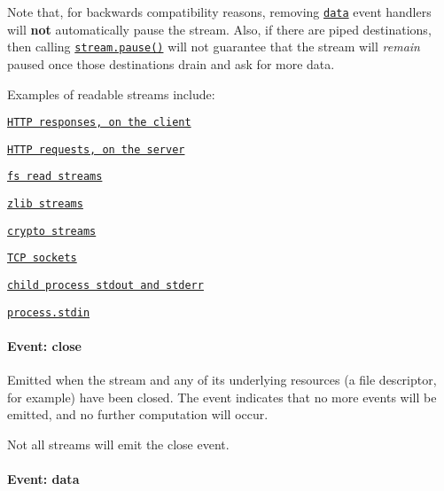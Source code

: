 Note that, for backwards compatibility reasons, removing \href{#stream_event_data}{\tt {\ttfamily \textquotesingle{}data\textquotesingle{}}} event handlers will {\bfseries not} automatically pause the stream. Also, if there are piped destinations, then calling \href{#stream_readable_pause}{\tt {\ttfamily stream.\+pause()}} will not guarantee that the stream will {\itshape remain} paused once those destinations drain and ask for more data.

Examples of readable streams include\+:


\begin{DoxyItemize}
\item \href{https://nodejs.org/docs/v5.8.0/api/http.html#http_class_http_incomingmessage}{\tt H\+T\+TP responses, on the client}
\item \href{https://nodejs.org/docs/v5.8.0/api/http.html#http_class_http_incomingmessage}{\tt H\+T\+TP requests, on the server}
\item \href{https://nodejs.org/docs/v5.8.0/api/fs.html#fs_class_fs_readstream}{\tt fs read streams}
\item \href{zlib.html}{\tt zlib streams}
\item \href{crypto.html}{\tt crypto streams}
\item \href{https://nodejs.org/docs/v5.8.0/api/net.html#net_class_net_socket}{\tt T\+CP sockets}
\item \href{https://nodejs.org/docs/v5.8.0/api/child_process.html#child_process_child_stdout}{\tt child process stdout and stderr}
\item \href{https://nodejs.org/docs/v5.8.0/api/process.html#process_process_stdin}{\tt {\ttfamily process.\+stdin}}
\end{DoxyItemize}

\paragraph*{Event\+: \textquotesingle{}close\textquotesingle{}}

Emitted when the stream and any of its underlying resources (a file descriptor, for example) have been closed. The event indicates that no more events will be emitted, and no further computation will occur.

Not all streams will emit the {\ttfamily \textquotesingle{}close\textquotesingle{}} event.

\paragraph*{Event\+: \textquotesingle{}data\textquotesingle{}}


